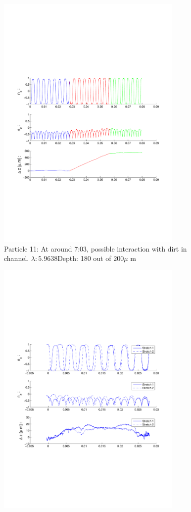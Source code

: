 \begin{figure}[H]
\centering
\includegraphics[width=0.8\textwidth]{Images/Particle 11/Particle11.pdf}
\caption{Particle 11: At around 7:03, possible interaction with dirt in channel. $ \lambda: 5.9638$Depth: 180 out of $200 \mu $ m}
\end{figure}

\begin{figure}[H]
\centering
\includegraphics[width=0.8\textwidth]{Images/Particle 11/Stretch1.pdf}
\end{figure}

